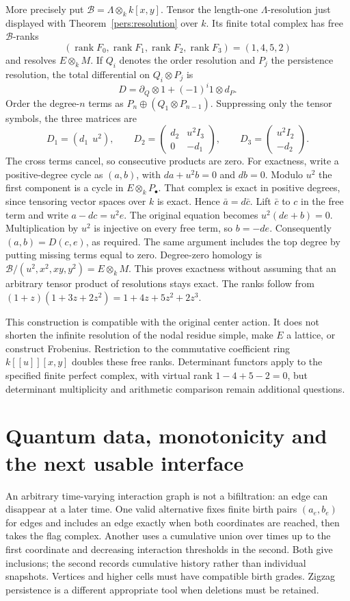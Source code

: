 \documentclass[11pt,oneside,openany]{book}
\theoremstyle{definition}\newtheorem{definition}[theorem]{Definition}
\theoremstyle{remark}\newtheorem{remark}[theorem]{Remark}
\begin{document}
More precisely put $\mathcal B=\Lambda\otimes_k k[x,y]$. Tensor the
length-one $\Lambda$-resolution just displayed with
Theorem~\ref{pers:resolution} over $k$. Its finite total complex has
free $\mathcal B$-ranks
\[
 (\operatorname{rank}F_0,\operatorname{rank}F_1,
   \operatorname{rank}F_2,\operatorname{rank}F_3)=(1,4,5,2)
\]
and resolves $E\otimes_k M$. If $Q_i$ denotes the order resolution and
$P_j$ the persistence resolution, the total differential on $Q_i\otimes P_j$
is
\[
 D=\partial_Q\otimes1+(-1)^i1\otimes d_P.
\]
Order the degree-$n$ terms as $P_n\oplus(Q_1\otimes P_{n-1})$.
Suppressing only the tensor symbols, the three matrices are
\[
 D_1=(d_1\ \ u^2),\qquad
 D_2=\begin{pmatrix}d_2&u^2I_3\\0&-d_1\end{pmatrix},\qquad
 D_3=\begin{pmatrix}u^2I_2\\-d_2\end{pmatrix}.
\]
The cross terms cancel, so consecutive products are zero. For exactness,
write a positive-degree cycle as $(a,b)$, with
$d a+u^2b=0$ and $d b=0$. Modulo $u^2$ the first component is a cycle
in $E\otimes_k P_\bullet$. That complex is exact in positive degrees,
since tensoring vector spaces over $k$ is exact. Hence
$\bar a=d\bar c$. Lift $\bar c$ to $c$ in the free term and write
$a-dc=u^2e$. The original equation becomes $u^2(de+b)=0$.
Multiplication by $u^2$ is injective on every free term, so $b=-de$.
Consequently $(a,b)=D(c,e)$, as required. The same argument includes
the top degree by putting missing terms equal to zero. Degree-zero
homology is $\mathcal B/(u^2,x^2,xy,y^2)=E\otimes_k M$.
This proves exactness without assuming that an arbitrary tensor product
of resolutions stays exact. The ranks follow from
$(1+z)(1+3z+2z^2)=1+4z+5z^2+2z^3$.

This construction is compatible with the original center action. It does
not shorten the infinite resolution of the nodal residue simple, make
$E$ a lattice, or construct Frobenius. Restriction to the commutative
coefficient ring $k[[u]][x,y]$ doubles these free ranks. Determinant
functors apply to the specified finite perfect complex, with virtual
rank $1-4+5-2=0$, but determinant multiplicity and arithmetic comparison
remain additional questions.

\section{Quantum data, monotonicity and the next usable interface}
An arbitrary time-varying interaction graph is not a bifiltration: an
edge can disappear at a later time. One valid alternative fixes finite
birth pairs $(a_e,b_e)$ for edges and includes an edge exactly when both
coordinates are reached, then takes the flag complex. Another uses a
cumulative union over times up to the first coordinate and decreasing
interaction thresholds in the second. Both give inclusions; the second
records cumulative history rather than individual snapshots. Vertices
and higher cells must have compatible birth grades. Zigzag persistence
is a different appropriate tool when deletions must be retained.
\end{document}
